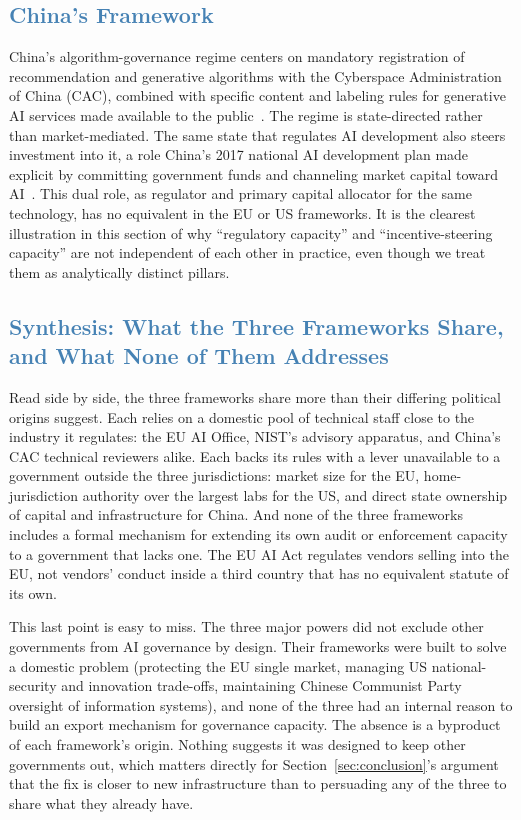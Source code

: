 \documentclass[journal]{IEEEtran}
\begin{document}
\subsection{\textcolor{steelblue}{China's Framework}}

China's algorithm-governance regime centers on mandatory registration of recommendation and generative algorithms with the Cyberspace Administration of China (CAC), combined with specific content and labeling rules for generative AI services made available to the public~\cite{cac2023interim}.
The regime is state-directed rather than market-mediated. The same state that regulates AI development also steers investment into it, a role China's 2017 national AI development plan made explicit by committing government funds and channeling market capital toward AI~\cite{china2017aiplan}.
This dual role, as regulator and primary capital allocator for the same technology, has no equivalent in the EU or US frameworks. It is the clearest illustration in this section of why ``regulatory capacity'' and ``incentive-steering capacity'' are not independent of each other in practice, even though we treat them as analytically distinct pillars.

\subsection{\textcolor{steelblue}{Synthesis: What the Three Frameworks Share, and What None of Them Addresses}}

Read side by side, the three frameworks share more than their differing political origins suggest. Each relies on a domestic pool of technical staff close to the industry it regulates: the EU AI Office, NIST's advisory apparatus, and China's CAC technical reviewers alike. Each backs its rules with a lever unavailable to a government outside the three jurisdictions: market size for the EU, home-jurisdiction authority over the largest labs for the US, and direct state ownership of capital and infrastructure for China. And none of the three frameworks includes a formal mechanism for extending its own audit or enforcement capacity to a government that lacks one. The EU AI Act regulates vendors selling into the EU, not vendors' conduct inside a third country that has no equivalent statute of its own.

This last point is easy to miss. The three major powers did not exclude other governments from AI governance by design. Their frameworks were built to solve a domestic problem (protecting the EU single market, managing US national-security and innovation trade-offs, maintaining Chinese Communist Party oversight of information systems), and none of the three had an internal reason to build an export mechanism for governance capacity. The absence is a byproduct of each framework's origin. Nothing suggests it was designed to keep other governments out, which matters directly for Section~\ref{sec:conclusion}'s argument that the fix is closer to new infrastructure than to persuading any of the three to share what they already have.
\end{document}
